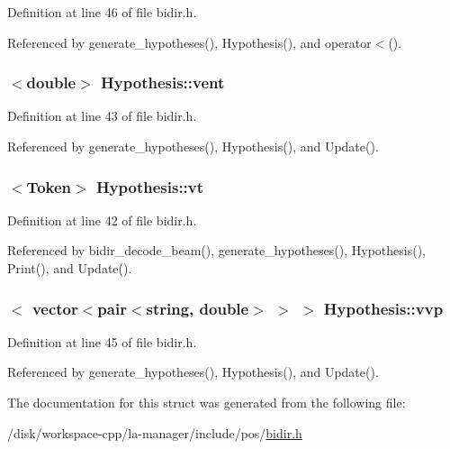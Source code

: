 Definition at line 46 of file bidir.h.

Referenced by generate\_\-hypotheses(), Hypothesis(), and operator$<$().\hypertarget{structHypothesis_71d6219f3db132b8f8cb6c1a74ee8e50}{
\subsubsection[{vent}]{$<$double$>$ {\bf Hypothesis::vent}}}
\label{structHypothesis_71d6219f3db132b8f8cb6c1a74ee8e50}




Definition at line 43 of file bidir.h.

Referenced by generate\_\-hypotheses(), Hypothesis(), and Update().\hypertarget{structHypothesis_358eab95366fb8cbe00d0ce77a2cba0c}{
\subsubsection[{vt}]{$<${\bf Token}$>$ {\bf Hypothesis::vt}}}
\label{structHypothesis_358eab95366fb8cbe00d0ce77a2cba0c}




Definition at line 42 of file bidir.h.

Referenced by bidir\_\-decode\_\-beam(), generate\_\-hypotheses(), Hypothesis(), Print(), and Update().\hypertarget{structHypothesis_6fc223c39b3b4589c72ef511d9c2dcc7}{
\subsubsection[{vvp}]{$<$ {\bf vector}$<$pair$<$string, double$>$ $>$ $>$ {\bf Hypothesis::vvp}}}
\label{structHypothesis_6fc223c39b3b4589c72ef511d9c2dcc7}




Definition at line 45 of file bidir.h.

Referenced by generate\_\-hypotheses(), Hypothesis(), and Update().

The documentation for this struct was generated from the following file:\begin{CompactItemize}
\item 
/disk/workspace-cpp/la-manager/include/pos/\hyperlink{bidir_8h}{bidir.h}\end{CompactItemize}
